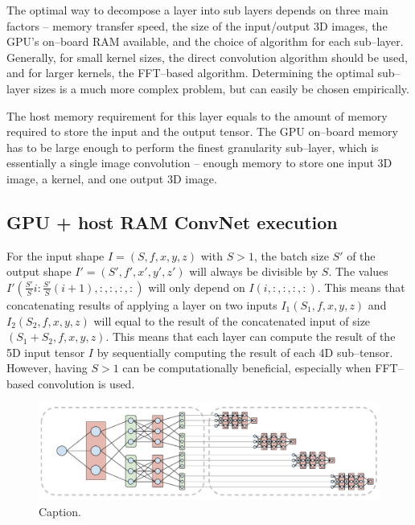 \documentclass[conference]{./IEEEtran/IEEEtran}
\begin{document}
  The optimal way to decompose a layer into sub layers depends on
  three main factors -- memory transfer speed, the size of the
  input/output 3D images, the GPU's on--board RAM available, and the
  choice of algorithm for each sub--layer.  Generally, for small
  kernel sizes, the direct convolution algorithm should be used, and
  for larger kernels, the FFT--based algorithm.  Determining the
  optimal sub--layer sizes is a much more complex problem, but can
  easily be chosen empirically.

  The host memory requirement for this layer equals to the amount of
  memory required to store the input and the output tensor.  The GPU
  on--board memory has to be large enough to perform the finest
  granularity sub--layer, which is essentially a single image
  convolution -- enough memory to store one input 3D image, a kernel,
  and one output 3D image.

\subsection{GPU + host RAM ConvNet execution}
  For the input shape $I = (S,f,x,y,z)$ with $S > 1$, the batch
  size $S'$ of the output shape $I' = (S',f',x',y',z')$ will always be
  divisible by $S$.  The values $I'(\frac{S'}{S} i : \frac{S'}{S}
  (i+1),:,:,:,:)$ will only depend on $I(i,:,:,:,:)$.  This means that
  concatenating results of applying a layer on two inputs
  $I_1(S_1,f,x,y,z)$ and $I_2(S_2,f,x,y,z)$ will equal to the result
  of the concatenated input of size $(S_1+S_2,f,x,y,z)$.  This means
  that each layer can compute the result of the 5D input tensor $I$ by
  sequentially computing the result of each 4D sub--tensor.  However,
  having $S > 1$ can be computationally beneficial, especially when
  FFT--based convolution is used.



  \begin{figure}
    \begin{center}
      \includegraphics[width=0.99\columnwidth]{fig/layer_vs_batch.pdf}
    \end{center}
    \caption{Caption.}
    \label{fig:layer-vs-batch}
  \end{figure}
\end{document}
